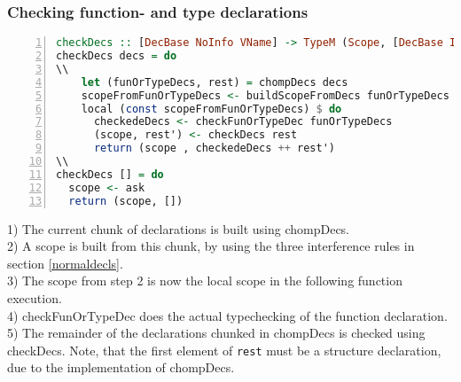 \subsubsection{Checking function- and type declarations}
\label{subsec:checkfunortype}
\begin{lstlisting}[language=Haskell, numbers=left]
checkDecs :: [DecBase NoInfo VName] -> TypeM (Scope, [DecBase Info VName])
checkDecs decs = do
\\
    let (funOrTypeDecs, rest) = chompDecs decs
    scopeFromFunOrTypeDecs <- buildScopeFromDecs funOrTypeDecs
    local (const scopeFromFunOrTypeDecs) $ do
      checkedeDecs <- checkFunOrTypeDec funOrTypeDecs
      (scope, rest') <- checkDecs rest
      return (scope , checkedeDecs ++ rest')
\\
checkDecs [] = do
  scope <- ask
  return (scope, [])
\end{lstlisting}
1) The current chunk of declarations is built using chompDecs. \\
2) A scope is built from this chunk, by using the three interference rules in
section \ref{normaldecls}.\\
3) The scope from step 2 is now the local scope in the following function
execution.\\
4) checkFunOrTypeDec does the actual typechecking of the function declaration. \\
5) The remainder of the declarations chunked in chompDecs is checked using
checkDecs. Note, that the first element of \texttt{rest} must be a structure
declaration, due to the implementation of chompDecs.
